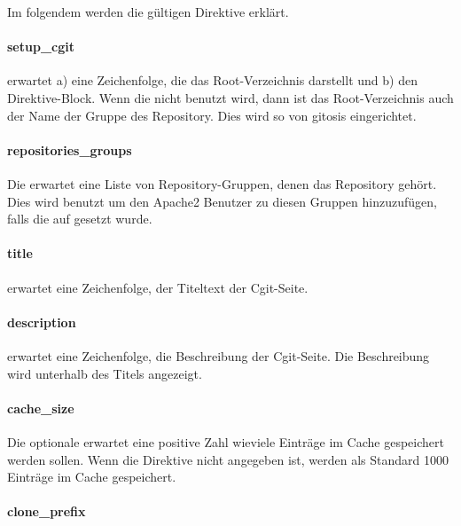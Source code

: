 Im folgendem werden die gültigen Direktive erklärt.

\paragraph{setup\_cgit}

 erwartet a) eine Zeichenfolge, die das Root-Verzeichnis
darstellt und b) den Direktive-Block. Wenn die 
nicht benutzt wird, dann ist das Root-Verzeichnis auch der Name der Gruppe des 
Repository. Dies wird so von gitosis eingerichtet.

\paragraph{repositories\_groups}

Die  erwartet eine Liste von Repository-Gruppen,
denen das Repository gehört. Dies wird benutzt um den Apache2 Benutzer zu diesen
Gruppen hinzuzufügen, falls die  auf 
gesetzt wurde.

\paragraph{title}

 erwartet eine Zeichenfolge, der Titeltext der Cgit-Seite.

\paragraph{description}

 erwartet eine Zeichenfolge, die Beschreibung der
Cgit-Seite. Die Beschreibung wird unterhalb des Titels angezeigt.

\paragraph{cache\_size}

Die optionale  erwartet eine positive Zahl wieviele Einträge im Cache gespeichert
werden sollen. Wenn die Direktive nicht angegeben ist, werden als Standard 1000 Einträge im Cache gespeichert.

\paragraph{clone\_prefix}

